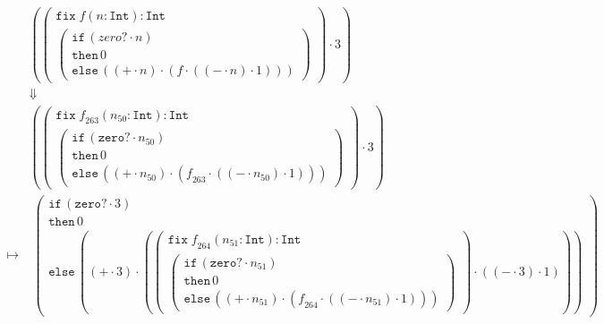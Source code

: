 \documentclass{article}
\begin{document}
\tiny\begin{align*}
&\left(\left(\begin{array}{l} \mathtt{fix}\; \mathit{f}(\mathit{n}:\mathtt{Int}): \mathtt{Int}\\\left(\begin{array}{l}\mathtt{if}\,\left(zero?\cdot \mathit{n}\right)\\\mathtt{then}\,0\\\mathtt{else}\,\left(\left(+\cdot \mathit{n}\right)\cdot \left(\mathit{f}\cdot \left(\left(-\cdot \mathit{n}\right)\cdot 1\right)\right)\right)\end{array}\right)\end{array}\right)\cdot 3\right)\\ 
&\Downarrow\\ 
&\left(\left(\begin{array}{l} \mathtt{fix}\; \mathit{f}_{263}(\mathit{n}_{50}:\mathtt{Int}): \mathtt{Int}\\\left(\begin{array}{l}\mathtt{if}\,\left(\mathtt{zero?}\cdot \mathit{n}_{50}\right)\\\mathtt{then}\,0\\\mathtt{else}\,\left(\left(\mathtt{+}\cdot \mathit{n}_{50}\right)\cdot \left(\mathit{f}_{263}\cdot \left(\left(\mathtt{-}\cdot \mathit{n}_{50}\right)\cdot 1\right)\right)\right)\end{array}\right)\end{array}\right)\cdot 3\right)\\ 
\longmapsto &\;\left(\begin{array}{l}\mathtt{if}\,\left(\mathtt{zero?}\cdot 3\right)\\\mathtt{then}\,0\\\mathtt{else}\,\left(\left(\mathtt{+}\cdot 3\right)\cdot \left(\left(\begin{array}{l} \mathtt{fix}\; \mathit{f}_{264}(\mathit{n}_{51}:\mathtt{Int}): \mathtt{Int}\\\left(\begin{array}{l}\mathtt{if}\,\left(\mathtt{zero?}\cdot \mathit{n}_{51}\right)\\\mathtt{then}\,0\\\mathtt{else}\,\left(\left(\mathtt{+}\cdot \mathit{n}_{51}\right)\cdot \left(\mathit{f}_{264}\cdot \left(\left(\mathtt{-}\cdot \mathit{n}_{51}\right)\cdot 1\right)\right)\right)\end{array}\right)\end{array}\right)\cdot \left(\left(\mathtt{-}\cdot 3\right)\cdot 1\right)\right)\right)\end{array}\right)\\ 

\end{align*}
\end{document}
